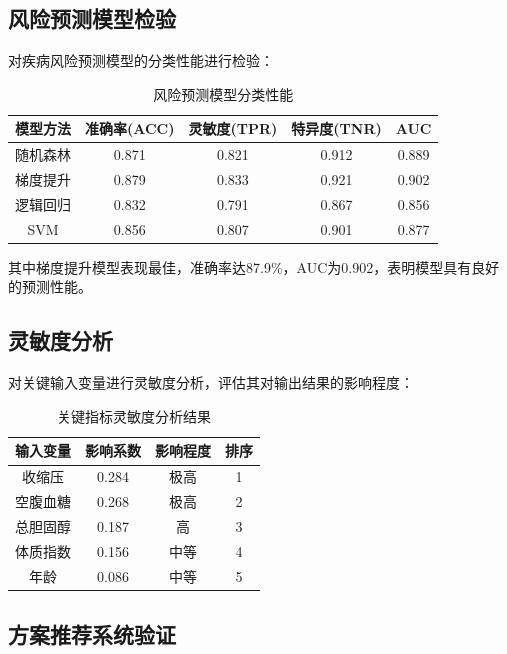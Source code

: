 \subsection{风险预测模型检验}

对疾病风险预测模型的分类性能进行检验：

\begin{table}[H]
  \centering
  \caption{风险预测模型分类性能}
  \label{tab:risk_prediction}
  \begin{tabularx}{\textwidth}{CCCCC}
    \toprule
    模型方法 & 准确率(ACC) & 灵敏度(TPR) & 特异度(TNR) & AUC \\
    \midrule
    随机森林 & 0.871 & 0.821 & 0.912 & 0.889 \\
    梯度提升 & 0.879 & 0.833 & 0.921 & 0.902 \\
    逻辑回归 & 0.832 & 0.791 & 0.867 & 0.856 \\
    SVM & 0.856 & 0.807 & 0.901 & 0.877 \\
    \bottomrule
  \end{tabularx}
\end{table}

其中梯度提升模型表现最佳，准确率达87.9\%，AUC为0.902，表明模型具有良好的预测性能。

\subsection{灵敏度分析}

对关键输入变量进行灵敏度分析，评估其对输出结果的影响程度：

\begin{table}[H]
  \centering
  \caption{关键指标灵敏度分析结果}
  \label{tab:sensitivity}
  \begin{tabularx}{\textwidth}{CCCC}
    \toprule
    输入变量 & 影响系数 & 影响程度 & 排序 \\
    \midrule
    收缩压 & 0.284 & 极高 & 1 \\
    空腹血糖 & 0.268 & 极高 & 2 \\
    总胆固醇 & 0.187 & 高 & 3 \\
    体质指数 & 0.156 & 中等 & 4 \\
    年龄 & 0.086 & 中等 & 5 \\
    \bottomrule
  \end{tabularx}
\end{table}

\subsection{方案推荐系统验证}

